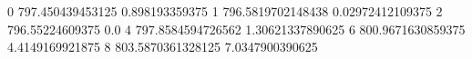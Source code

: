 0 797.450439453125 0.898193359375
1 796.5819702148438 0.02972412109375
2 796.55224609375 0.0
4 797.8584594726562 1.30621337890625
6 800.9671630859375 4.4149169921875
8 803.5870361328125 7.0347900390625
